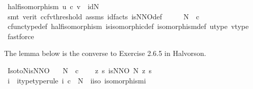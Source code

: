 \begin{isabellebody}
\ half{\isacharunderscore}{\kern0pt}isomorphism{}{\isacharcolon}{\kern0pt}\ {\isachardoublequoteopen}{\isacharparenleft}{\kern0pt}u\ {\isasymcirc}\isactrlsub c\ v{\isacharparenright}{\kern0pt}\ {\isacharequal}{\kern0pt}\ id{\isacharparenleft}{\kern0pt}N{\isacharparenright}{\kern0pt}{\isachardoublequoteclose}\isanewline
\ \ \ \isamarkupfalse%
\ {\isacharparenleft}{\kern0pt}smt\ {\isacharparenleft}{\kern0pt}verit{\isacharcomma}{\kern0pt}\ ccfv{\isacharunderscore}{\kern0pt}threshold{\isacharparenright}{\kern0pt}\ assms\ id{\isacharunderscore}{\kern0pt}facts{}\ is{\isacharunderscore}{\kern0pt}NNO{\isacharunderscore}{\kern0pt}def{\isacharparenright}{\kern0pt}\isanewline
\ \ \isamarkupfalse%
\ \isamarkupfalse%
\ {\isachardoublequoteopen}N\ {\isasymcong}\ {\isasymnat}\isactrlsub c{\isachardoublequoteclose}\isanewline
\ \ \ \ \isamarkupfalse%
\ cfunc{\isacharunderscore}{\kern0pt}type{\isacharunderscore}{\kern0pt}def\ half{\isacharunderscore}{\kern0pt}isomorphism\ is{\isacharunderscore}{\kern0pt}isomorphic{\isacharunderscore}{\kern0pt}def\ isomorphism{\isacharunderscore}{\kern0pt}def\ u{\isacharunderscore}{\kern0pt}type\ v{\isacharunderscore}{\kern0pt}type\ \isamarkupfalse%
\ fastforce\isanewline
{}\isamarkupfalse%
%
\endisatagproof
{\isafoldproof}%
%
\isadelimproof
%
\endisadelimproof
%
\begin{isamarkuptext}%
The lemma below is the converse to Exercise 2.6.5 in Halvorson.%
\end{isamarkuptext}\isamarkuptrue%
\isamarkupfalse%
\ Iso{\isacharunderscore}{\kern0pt}to{\isacharunderscore}{\kern0pt}N{\isacharunderscore}{\kern0pt}is{\isacharunderscore}{\kern0pt}NNO{\isacharcolon}{\kern0pt}\isanewline
\ \ \ {\isachardoublequoteopen}N\ {\isasymcong}\ {\isasymnat}\isactrlsub c{\isachardoublequoteclose}\isanewline
\ \ \ {\isachardoublequoteopen}{\isasymexists}\ z\ s{\isachardot}{\kern0pt}\ is{\isacharunderscore}{\kern0pt}NNO\ N\ z\ s{\isachardoublequoteclose}\isanewline
%
\isadelimproof
%
\endisadelimproof
%
\isatagproof
{}\isamarkupfalse%
\ {\isacharminus}{\kern0pt}\ \isanewline
\ \ \isamarkupfalse%
\ i\ \ i{\isacharunderscore}{\kern0pt}type{\isacharbrackleft}{\kern0pt}type{\isacharunderscore}{\kern0pt}rule{\isacharbrackright}{\kern0pt}{\isacharcolon}{\kern0pt}\ {\isachardoublequoteopen}i{\isacharcolon}{\kern0pt}\ {\isasymnat}\isactrlsub c\ {\isasymrightarrow}\ N{\isachardoublequoteclose}\ \ i{\isacharunderscore}{\kern0pt}iso{\isacharcolon}{\kern0pt}\ {\isachardoublequoteopen}isomorphism{\isacharparenleft}{\kern0pt}i{\isacharparenright}{\kern0pt}{\isachardoublequoteclose}\isanewline

\end{isabellebody}
